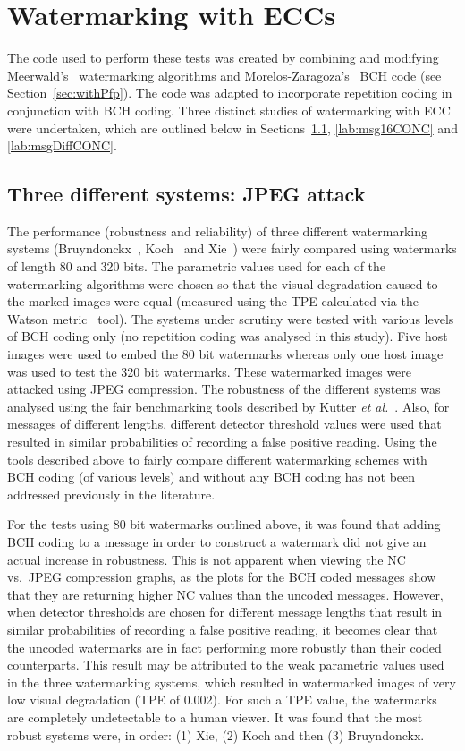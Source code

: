 \documentclass[12pt]{report}
\begin{document}
\section{Watermarking with ECCs}
The code used to perform these tests was created by combining and
modifying Meerwald's~\cite{meerMasters} watermarking algorithms and
Morelos-Zaragoza's~\cite{M_ZCONC} BCH code (see Section~\ref{sec:withPfp}).
The code was adapted to incorporate repetition coding in conjunction with BCH coding.
Three distinct studies of watermarking with ECC were undertaken, which are outlined below
in Sections~\ref{lab:BKXcompCONC}, \ref{lab:msg16CONC} and \ref{lab:msgDiffCONC}.

\subsection{Three different systems: JPEG attack}
	\label{lab:BKXcompCONC}
	The performance (robustness and reliability) of
	three different watermarking systems (Bruyndonckx~\cite{BKX:bruyn1Pap},
	Koch~\cite{BKX:koch1Pap} and Xie~\cite{BKX:xiePap}) were fairly compared using watermarks
	of length 80 and 320 bits. The parametric values used for each of the 
	watermarking algorithms were chosen so that the visual degradation caused to the 
	marked images were equal (measured using the TPE calculated via the Watson metric~\cite{watsonmetric, mayacheDI} tool).
	The systems under scrutiny were tested with various levels of BCH coding only (no
	repetition coding was analysed in this study). Five host images were used to embed the 
	80 bit watermarks whereas only one host image was used to test the 320 bit watermarks.
	These watermarked images were attacked
	using JPEG compression. The robustness of the different systems was analysed
	using the fair benchmarking tools described by Kutter \emph{et al.}~\cite{petit99}.
	Also, for messages of different lengths, different detector threshold values were 
	used that resulted in similar probabilities of recording a false positive reading.
	Using the tools described above to fairly compare different watermarking schemes 
	with BCH coding (of various levels) and without any BCH coding has not been addressed previously
	in the literature.

For the tests using 80 bit watermarks outlined above, it was found that 
adding BCH coding to a message in order to construct a watermark did not give an actual increase
in robustness. This is not apparent when viewing the NC vs.~JPEG compression graphs, as the 
plots for the BCH coded messages show that they are returning higher NC values than the uncoded messages.
However, when detector thresholds are chosen for different message lengths
that result in similar probabilities of recording a false positive reading, it becomes clear that the
uncoded watermarks are in fact performing more robustly than their coded counterparts.
This result may be attributed to the weak parametric values used in the three watermarking systems,
which resulted in watermarked images of very low visual degradation (TPE of 0.002). For such a TPE
value, the watermarks are completely undetectable to a human viewer. It was found that the most robust systems
were, in order: (1) Xie, (2) Koch and then (3) Bruyndonckx.
\end{document}
